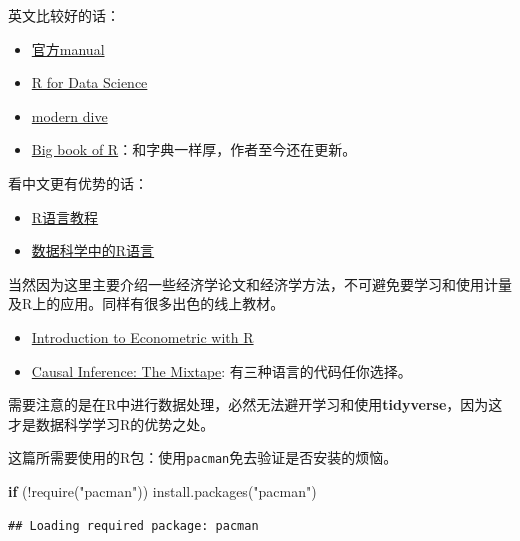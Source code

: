\documentclass[
  oneside]{book}
\newenvironment{Shaded}{\begin{snugshade}}{\end{snugshade}}
\newcommand{\ControlFlowTok}[1]{\textcolor[rgb]{0.13,0.29,0.53}{\textbf{#1}}}
\newcommand{\FunctionTok}[1]{\textcolor[rgb]{0.00,0.00,0.00}{#1}}
\newcommand{\NormalTok}[1]{#1}
\newcommand{\SpecialCharTok}[1]{\textcolor[rgb]{0.00,0.00,0.00}{#1}}
\newcommand{\StringTok}[1]{\textcolor[rgb]{0.31,0.60,0.02}{#1}}
\providecommand{\tightlist}{%
  \setlength{\itemsep}{0pt}\setlength{\parskip}{0pt}}
\begin{document}
英文比较好的话：

\begin{itemize}
\item
  \href{file:///Library/Frameworks/R.framework/Versions/4.2-arm64/Resources/doc/manual/R-intro.html}{官方manual}
\item
  \href{https://r4ds.had.co.nz/}{R for Data Science}
\item
  \href{https://moderndive.com/}{modern dive}
\item
  \href{https://www.bigbookofr.com/}{Big book of R}：和字典一样厚，作者至今还在更新。
\end{itemize}

看中文更有优势的话：

\begin{itemize}
\item
  \href{https://www.math.pku.edu.cn/teachers/lidf/docs/Rbook/html/_Rbook/index.html}{R语言教程}
\item
  \href{https://bookdown.org/wangminjie/R4DS/}{数据科学中的R语言}
\end{itemize}

当然因为这里主要介绍一些经济学论文和经济学方法，不可避免要学习和使用计量及R上的应用。同样有很多出色的线上教材。

\begin{itemize}
\tightlist
\item
  \href{https://www.econometrics-with-r.org/}{Introduction to Econometric with R}
\item
  \href{https://mixtape.scunning.com/}{Causal Inference: The Mixtape}: 有三种语言的代码任你选择。
\end{itemize}

需要注意的是在R中进行数据处理，必然无法避开学习和使用\textbf{tidyverse}，因为这才是数据科学学习R的优势之处。

这篇所需要使用的R包：使用\texttt{pacman}免去验证是否安装的烦恼。

\begin{Shaded}
\begin{Highlighting}[]
\ControlFlowTok{if}\NormalTok{ (}\SpecialCharTok{!}\FunctionTok{require}\NormalTok{(}\StringTok{"pacman"}\NormalTok{)) }\FunctionTok{install.packages}\NormalTok{(}\StringTok{"pacman"}\NormalTok{)}
\end{Highlighting}
\end{Shaded}

\begin{verbatim}
## Loading required package: pacman
\end{verbatim}
\end{document}
